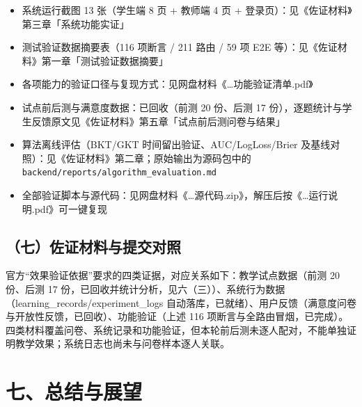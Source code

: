 \documentclass[zihao=-4,a4paper,UTF8,fontset=windows]{ctexart}
\begin{document}
\begin{itemize}[leftmargin=2em,itemsep=0pt,topsep=0pt]
\item 系统运行截图 13 张（学生端 8 页 + 教师端 4 页 + 登录页）：见《佐证材料》第三章「系统功能实证」
\end{itemize}
\begin{itemize}[leftmargin=2em,itemsep=0pt,topsep=0pt]
\item 测试验证数据摘要表（116 项断言 / 211 路由 / 59 项 E2E 等）：见《佐证材料》第一章「测试验证数据摘要」
\end{itemize}
\begin{itemize}[leftmargin=2em,itemsep=0pt,topsep=0pt]
\item 各项能力的验证口径与复现方式：见网盘材料《\dots{}功能验证清单.pdf》
\end{itemize}
\begin{itemize}[leftmargin=2em,itemsep=0pt,topsep=0pt]
\item 试点前后测与满意度数据：已回收（前测 20 份、后测 17 份），逐题统计与学生反馈原文见《佐证材料》第五章「试点前后测问卷与结果」
\end{itemize}
\begin{itemize}[leftmargin=2em,itemsep=0pt,topsep=0pt]
\item 算法离线评估（BKT/GKT 时间留出验证、AUC/LogLoss/Brier 及基线对照）：见《佐证材料》第二章；原始输出为源码包中的 \texttt{backend/reports/algorithm\_\allowbreak{}evaluation.\allowbreak{}md}
\end{itemize}
\begin{itemize}[leftmargin=2em,itemsep=0pt,topsep=0pt]
\item 全部验证脚本与源代码：见网盘材料《\dots{}源代码.zip》，解压后按《\dots{}运行说明.pdf》可一键复现
\end{itemize}
\subsection{（七）佐证材料与提交对照}


官方“效果验证依据”要求的四类证据，对应关系如下：教学试点数据（前测 20 份、后测 17 份，已回收并统计分析，见六（三））、系统行为数据（learning\_records/experiment\_logs 自动落库，已就绪）、用户反馈（满意度问卷与开放性反馈，已回收）、功能验证（上述 116 项断言与全路由冒烟，已完成）。四类材料覆盖问卷、系统记录和功能验证，但本轮前后测未逐人配对，不能单独证明教学效果；系统日志也尚未与问卷样本逐人关联。

\section{七、总结与展望}
\end{document}
